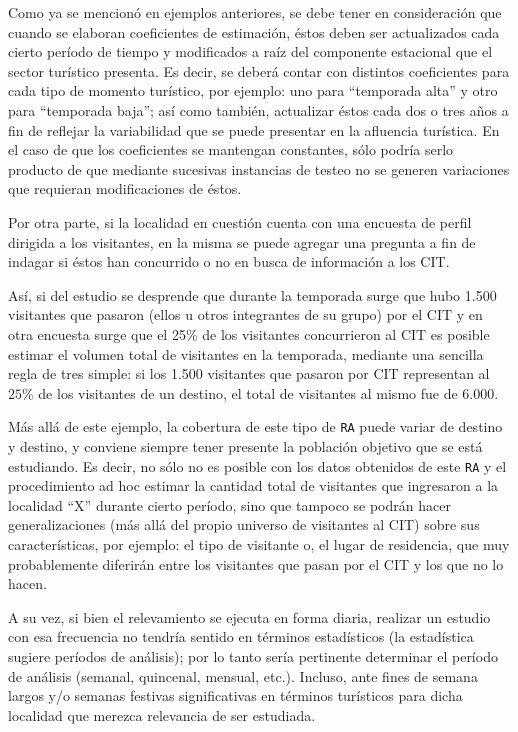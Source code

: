 \documentclass[
]{book}
\begin{document}
Como ya se mencionó en ejemplos anteriores, se debe tener en consideración que cuando se elaboran coeficientes de estimación, éstos deben ser actualizados cada cierto período de tiempo y modificados a raíz del componente estacional que el sector turístico presenta. Es decir, se deberá contar con distintos coeficientes para cada tipo de momento turístico, por ejemplo: uno para ``temporada alta'' y otro para ``temporada baja''; así como también, actualizar éstos cada dos o tres años a fin de reflejar la variabilidad que se puede presentar en la afluencia turística. En el caso de que los coeficientes se mantengan constantes, sólo podría serlo producto de que mediante sucesivas instancias de testeo no se generen variaciones que requieran modificaciones de éstos.

Por otra parte, si la localidad en cuestión cuenta con una encuesta de perfil dirigida a los visitantes, en la misma se puede agregar una pregunta a fin de indagar si éstos han concurrido o no en busca de información a los CIT.

Así, si del estudio se desprende que durante la temporada surge que hubo 1.500 visitantes que pasaron (ellos u otros integrantes de su grupo) por el CIT y en otra encuesta surge que el 25\% de los visitantes concurrieron al CIT es posible estimar el volumen total de visitantes en la temporada, mediante una sencilla regla de tres simple: si los 1.500 visitantes que pasaron por CIT representan al \(25\%\) de los visitantes de un destino, el total de visitantes al mismo fue de 6.000.

Más allá de este ejemplo, la cobertura de este tipo de \texttt{RA} puede variar de destino y destino, y conviene siempre tener presente la población objetivo que se está estudiando. Es decir, no sólo no es posible con los datos obtenidos de este \texttt{RA} y el procedimiento ad hoc estimar la cantidad total de visitantes que ingresaron a la localidad ``X'' durante cierto período, sino que tampoco se podrán hacer generalizaciones (más allá del propio universo de visitantes al CIT) sobre sus características, por ejemplo: el tipo de visitante o, el lugar de residencia, que muy probablemente diferirán entre los visitantes que pasan por el CIT y los que no lo hacen.

A su vez, si bien el relevamiento se ejecuta en forma diaria, realizar un estudio con esa frecuencia no tendría sentido en términos estadísticos (la estadística sugiere períodos de análisis); por lo tanto sería pertinente determinar el período de análisis (semanal, quincenal, mensual, etc.). Incluso, ante fines de semana largos y/o semanas festivas significativas en términos turísticos para dicha localidad que merezca relevancia de ser estudiada.
\end{document}
